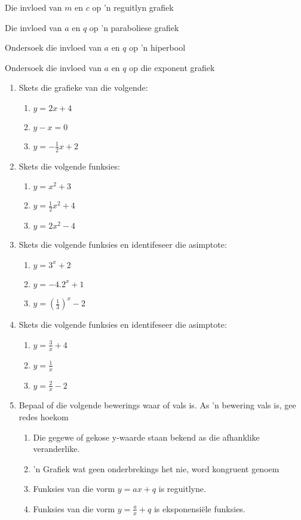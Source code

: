 \begin{Ondersoek}{Die invloed van $m$ en $c$ op 'n reguitlyn grafiek}
\begin{Ondersoek}{Die invloed van $a$ en $q$ op 'n paraboliese grafiek}
\begin{Ondersoek}{Ondersoek die invloed van $a$ en $q$ op 'n hiperbool}
\begin{Ondersoek}{Ondersoek die invloed van $a$ en $q$ op die exponent grafiek}
\begin{eocexercises}{}
\nopagebreak
\begin{enumerate}[noitemsep, label=\textbf{\arabic*}. ] 
\item Skets die grafieke van die volgende: 
    \begin{enumerate}[noitemsep, label=\textbf{\alph*}. ] 
    \item $y=2x+4$ 
    \item $y-x=0$ 
    \item $y=-\frac{1}{2}x+2$
    \end{enumerate}
\item Skets die volgende funksies: 
    \begin{enumerate}[noitemsep, label=\textbf{\alph*}. ] 
    \item $y={x}^{2}+3$ 
    \item $y=\frac{1}{2}{x}^{2}+4$
    \item $y=2{x}^{2}-4$
    \end{enumerate}
\item Skets die volgende funksies en identifeseer die asimptote: 
    \begin{enumerate}[noitemsep, label=\textbf{\alph*}. ] 
    \item $y={3}^{x}+2$ 
    \item $y=-4.{2}^{x}+1$ 
    \item $y=(\frac{1}{3})^x-2$ 
    \end{enumerate}
\item Skets die volgende funksies en identifeseer die asimptote: 
    \begin{enumerate}[noitemsep, label=\textbf{\alph*}. ] 
    \item $y=\frac{3}{x}+4$ 
    \item $y=\frac{1}{x}$ 
    \item $y=\frac{2}{x}-2$ 
    \end{enumerate}
\item Bepaal of die volgende bewerings waar of vals is. As 'n bewering vals is, gee redes hoekom
    \begin{enumerate}[noitemsep, label=\textbf{\alph*}. ] 
    \item  Die gegewe of gekose y-waarde staan bekend as die afhanklike veranderlike.
    \item 'n Grafiek wat geen onderbrekings het nie, word kongruent genoem
    \item Funksies van die vorm $y=ax+q$ is reguitlyne.
    \item Funksies van die vorm $y=\frac{a}{x}+q$ is eksponensiële funksies.

\end{enumerate}
\end{enumerate}
\end{eocexercises}
\end{Ondersoek}
\end{Ondersoek}
\end{Ondersoek}
\end{Ondersoek}
